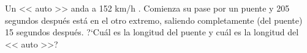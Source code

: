 Un << auto >> { anda } a { 152 km/h }. Comienza su pase por un puente y { 205 segundos } despu\'es est\'a en el otro extremo, saliendo completamente (del puente) { 15 segundos } despu\'es. ?`Cu\'al es la { longitud } del puente y cu\'al es la longitud del << auto >>? %
